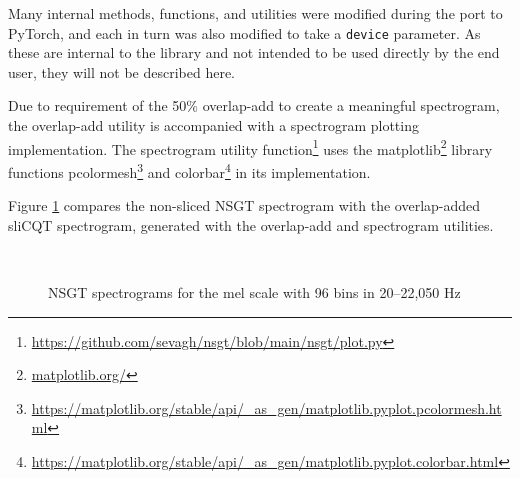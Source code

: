 \documentclass[report.tex]{subfiles}
\begin{document}
Many internal methods, functions, and utilities were modified during the port to PyTorch, and each in turn was also modified to take a \Verb#device# parameter. As these are internal to the library and not intended to be used directly by the end user, they will not be described here.

Due to requirement of the 50\% overlap-add to create a meaningful spectrogram, the overlap-add utility is accompanied with a spectrogram plotting implementation.  The spectrogram utility function\footnote{\url{https://github.com/sevagh/nsgt/blob/main/nsgt/plot.py}} uses the matplotlib\footnote{\url{matplotlib.org/}} library functions pcolormesh\footnote{\url{https://matplotlib.org/stable/api/_as_gen/matplotlib.pyplot.pcolormesh.html}} and colorbar\footnote{\url{https://matplotlib.org/stable/api/_as_gen/matplotlib.pyplot.colorbar.html}} in its implementation.

Figure \ref{fig:overlappedspectrograms} compares the non-sliced NSGT spectrogram with the overlap-added sliCQT spectrogram, generated with the overlap-add and spectrogram utilities.

\begin{figure}[ht]
	\centering
	\\
	\caption{NSGT spectrograms for the mel scale with 96 bins in 20--22,050 Hz}
	\label{fig:overlappedspectrograms}
\end{figure}
\end{document}
